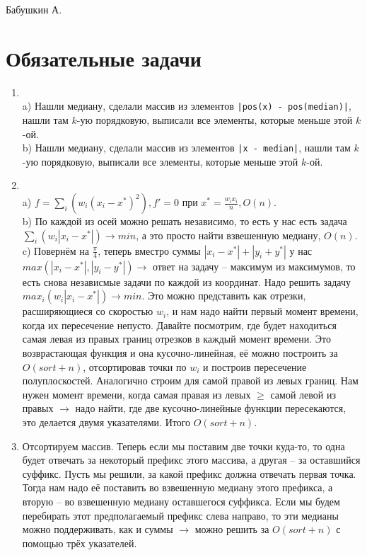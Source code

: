 \documentclass[12pt]{article}
\begin{document}
\def\t{\texttt}

Бабушкин А.

\section{Обязательные задачи}

\begin{enumerate}
	\setlength{\parskip}{0pt} 
	\setlength{\itemsep}{0pt} 
	\item ~\\
	a) Нашли медиану, сделали массив из элементов \t{|pos(x) - pos(median)|}, нашли там $k$-ую порядковую, выписали все элементы, которые меньше этой $k$-ой. \\
	b) Нашли медиану, сделали массив из элементов \t{|x - median|}, нашли там $k$-ую порядковую, выписали все элементы, которые меньше этой $k$-ой. \\
	\item ~\\
	a) $f = \sum_i(w_i(x_i - x^*)^2), f' = 0$ при $x^* = \frac{w_ix_i}{n}, O(n)$. \\
	b) По каждой из осей можно решать независимо, то есть у нас есть задача $\sum_i(w_i|x_i - x^*|) \to min$, а это просто найти взвешенную медиану, $O(n)$. \\
	c) Повернём на $\frac{\pi}{4}$, теперь вместро суммы $|x_i - x^*| + |y_i + y^*|$ у нас $max(|x_i - x^*|, |y_i - y^*|) \to$ ответ на задачу -- максимум из максимумов, то есть снова независмые задачи по каждой из координат. Надо решить задачу $max_i(w_i|x_i - x^*|) \to min$. Это можно представить как отрезки, расширяющиеся со скоростью $w_i$, и нам надо найти первый момент времени, когда их пересечение непусто. Давайте посмотрим, где будет находиться самая левая из правых границ отрезков в каждый момент времени. Это возврастающая функция и она кусочно-линейная, её можно построить за $O(sort + n)$, отсортировав точки по $w_i$ и построив пересечение полуплоскостей. Аналогично строим для самой правой из левых границ. Нам нужен момент времени, когда самая правая из левых $\ge$ самой левой из правых $\to$ надо найти, где две кусочно-линейные функции пересекаются, это делается двумя указателями. Итого $O(sort + n)$. \\
	\item Отсортируем массив. Теперь если мы поставим две точки куда-то, то одна будет отвечать за некоторый префикс этого массива, а другая -- за оставшийся суффикс. Пусть мы решили, за какой префикс должна отвечать первая точка. Тогда нам надо её поставить во взвешенную медиану этого префикса, а вторую -- во взвешенную медиану оставшегося суффикса. Если мы будем перебирать этот предполагаемый префикс слева направо, то эти медианы можно поддерживать, как и суммы $\to$ можно решить за $O(sort + n)$ с помощью трёх указателей. \\
\end{enumerate}
\end{document}
